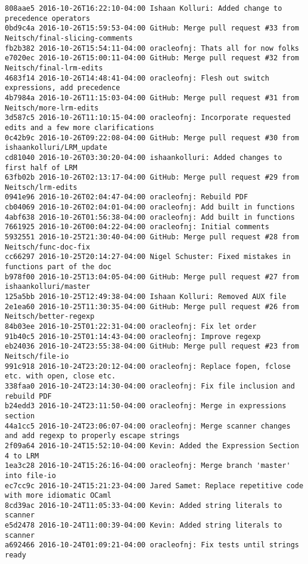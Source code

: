\begin{lstlisting}
808aae5 2016-10-26T16:22:10-04:00 Ishaan Kolluri: Added change to precedence operators
0bd9c4a 2016-10-26T15:59:53-04:00 GitHub: Merge pull request #33 from Neitsch/final-slicing-comments
fb2b382 2016-10-26T15:54:11-04:00 oracleofnj: Thats all for now folks
e7020ec 2016-10-26T15:00:11-04:00 GitHub: Merge pull request #32 from Neitsch/final-lrm-edits
4683f14 2016-10-26T14:48:41-04:00 oracleofnj: Flesh out switch expressions, add precedence
4b7984a 2016-10-26T11:15:03-04:00 GitHub: Merge pull request #31 from Neitsch/more-lrm-edits
3d587c5 2016-10-26T11:10:15-04:00 oracleofnj: Incorporate requested edits and a few more clarifications
0c42b9c 2016-10-26T09:22:08-04:00 GitHub: Merge pull request #30 from ishaankolluri/LRM_update
cd81040 2016-10-26T03:30:20-04:00 ishaankolluri: Added changes to first half of LRM
63fb02b 2016-10-26T02:13:17-04:00 GitHub: Merge pull request #29 from Neitsch/lrm-edits
0941e96 2016-10-26T02:04:47-04:00 oracleofnj: Rebuild PDF
cb04069 2016-10-26T02:04:01-04:00 oracleofnj: Add built in functions
4abf638 2016-10-26T01:56:38-04:00 oracleofnj: Add built in functions
7661925 2016-10-26T00:04:22-04:00 oracleofnj: Initial comments
5932551 2016-10-25T21:30:40-04:00 GitHub: Merge pull request #28 from Neitsch/func-doc-fix
cc66297 2016-10-25T20:14:27-04:00 Nigel Schuster: Fixed mistakes in functions part of the doc
b978f00 2016-10-25T13:04:05-04:00 GitHub: Merge pull request #27 from ishaankolluri/master
125a5bb 2016-10-25T12:49:38-04:00 Ishaan Kolluri: Removed AUX file
2e1ea60 2016-10-25T11:30:35-04:00 GitHub: Merge pull request #26 from Neitsch/better-regexp
84b03ee 2016-10-25T01:22:31-04:00 oracleofnj: Fix let order
91b40c5 2016-10-25T01:14:43-04:00 oracleofnj: Improve regexp
eb24036 2016-10-24T23:55:38-04:00 GitHub: Merge pull request #23 from Neitsch/file-io
991c918 2016-10-24T23:20:12-04:00 oracleofnj: Replace fopen, fclose etc. with open, close etc.
338faa0 2016-10-24T23:14:30-04:00 oracleofnj: Fix file inclusion and rebuild PDF
b24edd3 2016-10-24T23:11:50-04:00 oracleofnj: Merge in expressions section
44a1cc5 2016-10-24T23:06:07-04:00 oracleofnj: Merge scanner changes and add regexp to properly escape strings
2f09a64 2016-10-24T15:52:10-04:00 Kevin: Added the Expression Section 4 to LRM
1ea3c28 2016-10-24T15:26:16-04:00 oracleofnj: Merge branch 'master' into file-io
ec7cc9c 2016-10-24T15:21:23-04:00 Jared Samet: Replace repetitive code with more idiomatic OCaml
8cd39ac 2016-10-24T11:05:33-04:00 Kevin: Added string literals to scanner
e5d2478 2016-10-24T11:00:39-04:00 Kevin: Added string literals to scanner
a692466 2016-10-24T01:09:21-04:00 oracleofnj: Fix tests until strings ready

\end{lstlisting}
